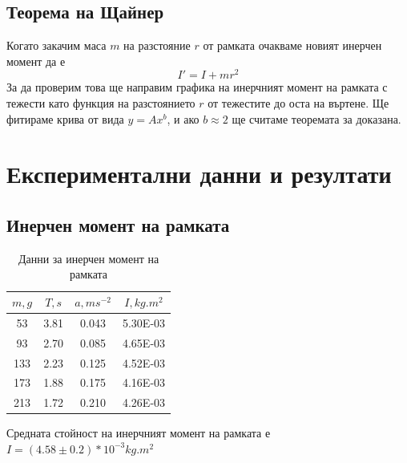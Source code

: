 \documentclass[aps, prb, twocolumn, a4paper, floatfix, reprint]{revtex4-2}
\begin{document}
\subsection{Теорема на Щайнер}
Когато закачим маса $m$ на разстояние $r$ от рамката очакваме новият инерчен момент да е 
\begin{equation*}
    I' = I + mr^2
\end{equation*}
За да проверим това ще направим графика на инерчният момент на рамката с тежести като функция на разстоянието $r$ от тежестите до оста на въртене. Ще фитираме крива от вида $y=Ax^b$, и ако $b \approx 2$ ще считаме теоремата за доказана. 
\section{Експериментални данни и резултати}
\subsection{Инерчен момент на рамката}
\begin{table}[H]
    \caption{Данни за инерчен момент на рамката}
    \begin{ruledtabular}
        \begin{tabular}{*{4}{c}}
            \multicolumn{1}{c}{$m, g$} &
            \multicolumn{1}{c}{$T, s$} &
            \multicolumn{1}{c}{$a, ms^{-2}$} &
            \multicolumn{1}{c}{$I, kg.m^2$}                \\[2pt]
            \midrule
            53   & 3.81          & 0.043                     & 5.30E-03                   \\
            93   & 2.70          & 0.085                     & 4.65E-03                   \\
            133  & 2.23          & 0.125                     & 4.52E-03                   \\
            173  & 1.88          & 0.175                     & 4.16E-03                   \\
            213  & 1.72          & 0.210                     & 4.26E-03                  
        \end{tabular}
    \end{ruledtabular}
\end{table}

Средната стойност на инерчният момент на рамката е $I = (4.58 \pm 0.2)*10^{-3} kg.m^2$
\end{document}

